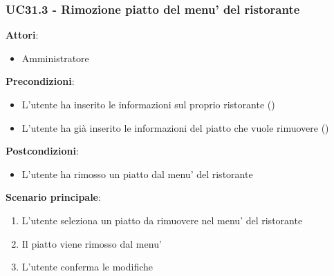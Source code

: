 \subsubsection{UC31.3 - Rimozione piatto del menu' del ristorante}\label{usecase:31_3}
\textbf{Attori}:
\begin{itemize}
    \item Amministratore
\end{itemize}
\textbf{Precondizioni}:
\begin{itemize}
    \item L'utente ha inserito le informazioni sul proprio ristorante ()
    \item L'utente ha già inserito le informazioni del piatto che vuole rimuovere ()
\end{itemize}
\textbf{Postcondizioni}:
\begin{itemize}
    \item L'utente ha rimosso un piatto dal menu' del ristorante
\end{itemize}
\textbf{Scenario principale}:
\begin{enumerate}
    \item L'utente seleziona un piatto da rimuovere nel menu' del ristorante
    \item Il piatto viene rimosso dal menu'
    \item L'utente conferma le modifiche
\end{enumerate}
\newpage